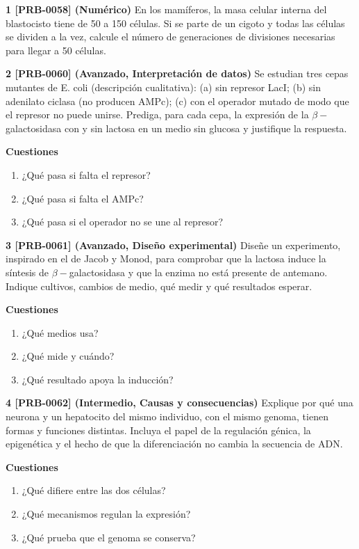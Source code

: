 \documentclass{book}
\begin{document}
\begin{tcolorbox}[title={Ejercicios}, studiumworked, breakable]

\noindent\textbf{1 [PRB-0058] (Numérico)}
En los mamíferos, la masa celular interna del blastocisto tiene de 50 a 150 células. Si se parte de un cigoto y todas las células se dividen a la vez, calcule el número de generaciones de divisiones necesarias para llegar a 50 células.


\noindent\textbf{2 [PRB-0060] (Avanzado, Interpretación de datos)}
Se estudian tres cepas mutantes de E. coli (descripción cualitativa): (a) sin represor LacI; (b) sin adenilato ciclasa (no producen AMPc); (c) con el operador mutado de modo que el represor no puede unirse. Prediga, para cada cepa, la expresión de la \(\beta-\)galactosidasa con y sin lactosa en un medio sin glucosa y justifique la respuesta.


\noindent\textbf{Cuestiones}
\begin{enumerate}
\item ¿Qué pasa si falta el represor?
\item ¿Qué pasa si falta el AMPc?
\item ¿Qué pasa si el operador no se une al represor?
\end{enumerate}

\noindent\textbf{3 [PRB-0061] (Avanzado, Diseño experimental)}
Diseñe un experimento, inspirado en el de Jacob y Monod, para comprobar que la lactosa induce la síntesis de \(\beta-\)galactosidasa y que la enzima no está presente de antemano. Indique cultivos, cambios de medio, qué medir y qué resultados esperar.


\noindent\textbf{Cuestiones}
\begin{enumerate}
\item ¿Qué medios usa?
\item ¿Qué mide y cuándo?
\item ¿Qué resultado apoya la inducción?
\end{enumerate}

\noindent\textbf{4 [PRB-0062] (Intermedio, Causas y consecuencias)}
Explique por qué una neurona y un hepatocito del mismo individuo, con el mismo genoma, tienen formas y funciones distintas. Incluya el papel de la regulación génica, la epigenética y el hecho de que la diferenciación no cambia la secuencia de ADN.


\noindent\textbf{Cuestiones}
\begin{enumerate}
\item ¿Qué difiere entre las dos células?
\item ¿Qué mecanismos regulan la expresión?
\item ¿Qué prueba que el genoma se conserva?
\end{enumerate}


\end{tcolorbox}
\end{document}
